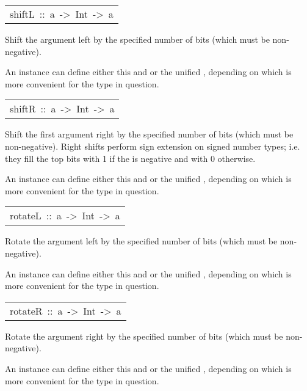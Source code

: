 \begin{haddockdesc}
\begin{haddockdesc}
\end{haddockdesc}
\begin{haddockdesc}
\item[\begin{tabular}{@{}l}
shiftL\ ::\ a\ ->\ Int\ ->\ a
\end{tabular}]\haddockbegindoc
Shift the argument left by the specified number of bits
        (which must be non-negative).
\par
An instance can define either this and  or the unified
        , depending on which is more convenient for the type in
        question. 
\par

\end{haddockdesc}
\begin{haddockdesc}
\item[\begin{tabular}{@{}l}
shiftR\ ::\ a\ ->\ Int\ ->\ a
\end{tabular}]\haddockbegindoc
Shift the first argument right by the specified number of bits
        (which must be non-negative).
        Right shifts perform sign extension on signed number types;
        i.e. they fill the top bits with 1 if the  is negative
        and with 0 otherwise.
\par
An instance can define either this and  or the unified
        , depending on which is more convenient for the type in
        question. 
\par

\end{haddockdesc}
\begin{haddockdesc}
\item[\begin{tabular}{@{}l}
rotateL\ ::\ a\ ->\ Int\ ->\ a
\end{tabular}]\haddockbegindoc
Rotate the argument left by the specified number of bits
        (which must be non-negative).
\par
An instance can define either this and  or the unified
        , depending on which is more convenient for the type in
        question. 
\par

\end{haddockdesc}
\begin{haddockdesc}
\item[\begin{tabular}{@{}l}
rotateR\ ::\ a\ ->\ Int\ ->\ a
\end{tabular}]\haddockbegindoc
Rotate the argument right by the specified number of bits
        (which must be non-negative).
\par
An instance can define either this and  or the unified
        , depending on which is more convenient for the type in
        question. 
\par

\end{haddockdesc}
\end{haddockdesc}
